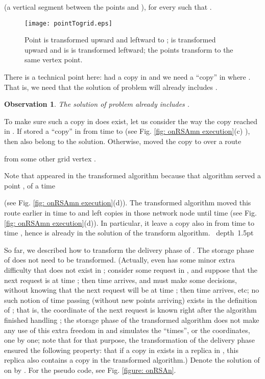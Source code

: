 \documentclass[11pt]{article}
\newtheorem{observation}[theorem]{Observation}
\def\proof{\par\noindent{\bf Proof:~}}
\def\blackslug{\hbox{\hskip 1pt \vrule width 4pt height 8pt
    depth 1.5pt \hskip 1pt}}
\def\QED{\quad\blackslug\lower 8.5pt\null\par}
\begin{document}
(a vertical segment between the points  and ),
for every  such that .







\def\FigpointTogrid{
\begin{figure}[ht!]
\begin{center}
\texttt{[image: pointTogrid.eps]}
\end{center}
\caption{\sf Point  is transformed upward and leftward to ;  is transformed upward and  is is transformed leftward;  the points transform to the same vertex point.
\label{fig: pointsTogrid}}
\end{figure}
} \FigpointTogrid

There is a technical point here:
 had a copy in  and we need a ``copy''  in  where .
That is, we need that the solution of  problem will already includes .

\begin{observation}
The solution of  problem already includes .
\label{obser:SRSA: (u,y) in the solution}
\end{observation}
\def\AppObserSRSAuyInTheSolution{
\proof
To make sure such a copy in  does exist, let us consider the way the copy reached  in .
If  stored a ``copy'' in  from time  to 
(see Fig. \ref{fig: onRSAmn execution}(c)
),
then also  belong to the solution.
Otherwise,  moved the copy to  over a route

from some other grid vertex .

Note that  appeared in the transformed algorithm because that algorithm served a point
, of a time

(see Fig. \ref{fig: onRSAmn execution}(d)).
The transformed algorithm moved this route 
earlier in time to
 and left copies in those network node until time  (see Fig. \ref{fig: onRSAmn execution}(d)).
In particular, it leave a copy also in  from time  to time , hence  is already in the solution of the transform algorithm.
\QED
} \AppObserSRSAuyInTheSolution



So far, we described how to transform the delivery phase of . The storage phase of  does not need to be transformed.
(Actually,  even has some minor extra difficulty that does not exist in ;
consider some request  in , and suppose that the
next request  is at time ; then time  arrives, and  must make some decisions, without knowing that the next request will be at time ; then time  arrives, etc; no such notion of time passing (without new points arriving) exists in the definition of ; that is, the  coordinate  of the next request  is known right after the algorithm finished handling ; the storage phase of the transformed algorithm does not make any use of this extra freedom in 
and simulates the ``times'', or the  coordinates, one by one; note that for that purpose, the transformation of the delivery phase ensured the following property: that if a copy in
 exists in a replica  in , this replica also contains a copy in the transformed algorithm.)
Denote the solution of  on  by .
For the pseudo code, see Fig. \ref{figure: onRSAn}.
\end{document}
